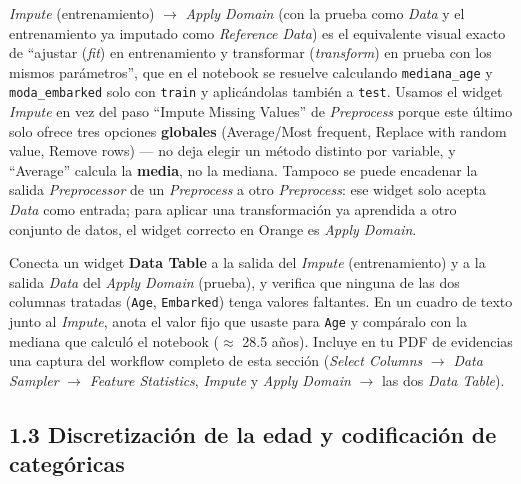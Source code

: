 \documentclass[11pt,letterpaper]{article}
\begin{document}
\begin{nota}
\textit{Impute} (entrenamiento) $\to$ \textit{Apply Domain} (con la prueba como \textit{Data} y el entrenamiento ya imputado como \textit{Reference Data}) es el equivalente visual exacto de ``ajustar (\textit{fit}) en entrenamiento y transformar (\textit{transform}) en prueba con los mismos parámetros'', que en el notebook se resuelve calculando \texttt{mediana\_age} y \texttt{moda\_embarked} solo con \texttt{train} y aplicándolas también a \texttt{test}. Usamos el widget \textit{Impute} en vez del paso ``Impute Missing Values'' de \textit{Preprocess} porque este último solo ofrece tres opciones \textbf{globales} (Average/Most frequent, Replace with random value, Remove rows) --- no deja elegir un método distinto por variable, y ``Average'' calcula la \textbf{media}, no la mediana. Tampoco se puede encadenar la salida \textit{Preprocessor} de un \textit{Preprocess} a otro \textit{Preprocess}: ese widget solo acepta \textit{Data} como entrada; para aplicar una transformación ya aprendida a otro conjunto de datos, el widget correcto en Orange es \textit{Apply Domain}.
\end{nota}

\begin{actividad}
Conecta un widget \textbf{Data Table} a la salida del \textit{Impute} (entrenamiento) y a la salida \textit{Data} del \textit{Apply Domain} (prueba), y verifica que ninguna de las dos columnas tratadas (\texttt{Age}, \texttt{Embarked}) tenga valores faltantes. En un cuadro de texto junto al \textit{Impute}, anota el valor fijo que usaste para \texttt{Age} y compáralo con la mediana que calculó el notebook ($\approx$ 28.5 años). Incluye en tu PDF de evidencias una captura del workflow completo de esta sección (\textit{Select Columns} $\to$ \textit{Data Sampler} $\to$ \textit{Feature Statistics}, \textit{Impute} y \textit{Apply Domain} $\to$ las dos \textit{Data Table}).
\end{actividad}

\subsection{1.3 Discretización de la edad y codificación de categóricas}
\end{document}
